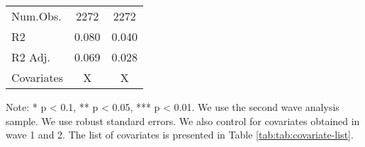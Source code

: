 \begin{table}
\begin{threeparttable}
\begin{tabular}[t]{lcc}
\midrule
Num.Obs. & \num{2272} & \num{2272}\\
R2 & \num{0.080} & \num{0.040}\\
R2 Adj. & \num{0.069} & \num{0.028}\\
Covariates & X & X\\
\bottomrule
\end{tabular}
\begin{tablenotes}
\item Note: * p < 0.1, ** p < 0.05, *** p < 0.01. We use the second wave analysis sample. We use robust standard errors. We also control for covariates obtained in wave 1 and 2. The list of covariates is presented in Table \ref{tab:tab:covariate-list}.
\end{tablenotes}
\end{threeparttable}
\end{table}
